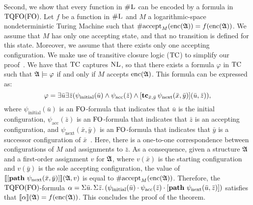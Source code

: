 Second, we show that every function in $\text{\sc \#L}$ can be encoded by a formula in ${\rm TQFO}({\rm FO})$.
Let $f$ be a function in $\text{\sc \#L}$ and $M$ a logarithmic-space nondeterministic  Turing Machine such that $\text{\rm \#accept}_M({\rm enc}(\mathfrak{A})) = f({\rm enc}(\mathfrak{A}))$. We assume that $M$ has only one accepting state, and that no transition is defined for this state. Moreover, we assume that there exists only one accepting configuration. We make use of transitive closure logic (${\rm TC}$) to simplify our proof~\cite{G07}. We have that ${\rm TC}$ captures $\text{\sc NL}$\cite{I83}, so that there exists a formula $\varphi$ in ${\rm TC}$ such that $\mathfrak{A}\models\varphi$ if and only if $M$ accepts ${\rm enc}(\mathfrak{A})$. This formula can be expressed as:
$$
\varphi = \exists\bar{u}\exists\bar{z}(\psi_{\text{initial}}(\bar{u})\wedge \psi_{\text{acc}}(\bar{z})\wedge[{\bf tc}_{\bar{x},\bar{y}}\,\psi_{\text{next}}(\bar{x},\bar{y})](\bar{u},\bar{z})),
$$
where $\psi_{\text{initial}}(\bar{u})$ is an ${\rm FO}$-formula that indicates that $\bar{u}$ is the initial configuration, $\psi_{\text{acc}}(\bar{z})$ is an ${\rm FO}$-formula that indicates that $\bar{z}$ is an accepting configuration, and $\psi_{\text{next}}(\bar{x},\bar{y})$ is an ${\rm FO}$-formula that indicates that $\bar{y}$ is a successor configuration of $\bar{x}$~\cite{G07}. Here, there is a one-to-one correspondence between configurations of $M$ and assignments to $\bar{z}$. As a consequence, given a structure $\mathfrak{A}$ and a first-order assignment $v$ for $\mathfrak{A}$, where $v(\bar{x})$ is the starting configuration and $v(\bar{y})$ is the sole accepting configuration, the value of ${\llbracket{}{[{\bf path} \,\, \psi_{\text{next}}(\bar{x},\bar{y})]}\rrbracket}(\mathfrak{A},v)$ is equal to $\text{\rm \#accept}_M({\rm enc}(\mathfrak{A}))$.
Therefore, the ${\rm TQFO}({\rm FO})$-formula
$
\alpha = \Sigma{\bar{u}}.\,\Sigma{\bar{z}}.\,(\psi_{\text{initial}}(\bar{u})\cdot\psi_{\text{acc}}(\bar{z})\cdot[{\bf path} \,\, \psi_{\text{next}}(\bar{u},\bar{z})])
$
satisfies that ${\llbracket{}{\alpha}\rrbracket}(\mathfrak{A}) = f({\rm enc}(\mathfrak{A}))$. This concludes the proof of the theorem.
